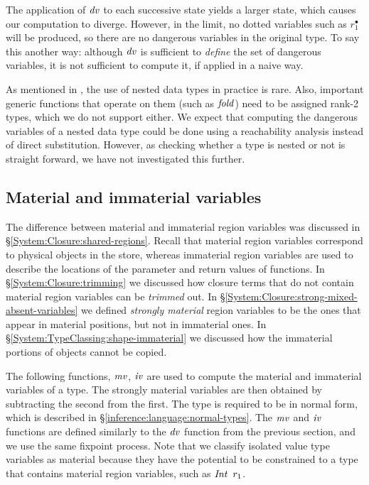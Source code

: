 The application of $\operatorname{\mathit{dv}}$ to each successive state yields a larger state, which causes our computation to diverge. However, in the limit, no dotted variables such as $r_1^\bullet$ will be produced, so there are no dangerous variables in the original type. To say this another way: although $\operatorname{\mathit{dv}}$ is sufficient to \emph{define} the set of dangerous variables, it is not sufficient to compute it, if applied in a naive way. 

As mentioned in \cite{bird:nested-datatypes}, the use of nested data types in practice is rare. Also, important generic functions that operate on them (such as $\operatorname{\mathit{fold}}$) need to be assigned rank-2 types, which we do not support either. We expect that computing the dangerous variables of a nested data type could be done using a reachability analysis instead of direct substitution. However, as checking whether a type is nested or not is straight forward, we have not investigated this further. 


\subsection{Material and immaterial variables}
\label{inference:material-regions}

The difference between material and immaterial region variables was discussed in \S\ref{System:Closure:shared-regions}. Recall that material region variables correspond to physical objects in the store, whereas immaterial region variables are used to describe the locations of the parameter and return values of functions. In \S\ref{System:Closure:trimming} we discussed how closure terms that do not contain material region variables can be \emph{trimmed} out. In \S\ref{System:Closure:strong-mixed-absent-variables} we defined \emph{strongly material} region variables to be the ones that appear in material positions, but not in immaterial ones. In \S\ref{System:TypeClassing:shape-immaterial} we discussed how the immaterial portions of objects cannot be copied.

The following functions, $\operatorname{\mathit{mv}}$, $\operatorname{\mathit{iv}}$ are used to compute the material and immaterial variables of a type. The strongly material variables are then obtained by subtracting the second from the first. The type is required to be in normal form, which is described in \S\ref{inference:language:normal-types}. The $\operatorname{\mathit{mv}}$ and $\operatorname{\mathit{iv}}$ functions are defined similarly to the $\operatorname{\mathit{dv}}$ function from the previous section, and we use the same fixpoint process. Note that we classify isolated value type variables as material because they have the potential to be constrained to a type that contains material region variables, such as $\operatorname{\mathit{Int}} \ r_1$.


